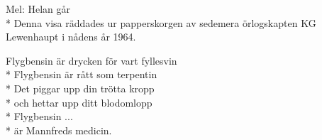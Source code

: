 \begin{SongText}
    \begin{SongInfo}
        Mel: Helan går\\*%
        Denna visa räddades ur papperskorgen av sedemera örlogskapten KG Lewenhaupt i nådens år 1964.
    \end{SongInfo}
    \begin{SongVerse}
        Flygbensin är drycken för vart fyllesvin\\*%
        Flygbensin är rått som terpentin\\*%
        Det piggar upp din trötta kropp\\*%
        och hettar upp ditt blodomlopp\\*%
        Flygbensin ...\\*%
        är Mannfreds medicin.
    \end{SongVerse}
\end{SongText}
